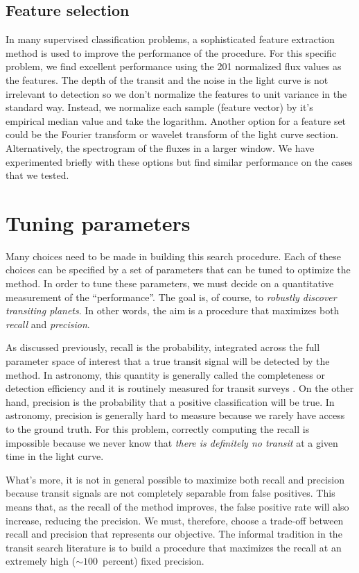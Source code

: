 \documentclass[12pt,preprint]{aastex}
\newcommand{\sectlabel}[1]{\label{sect:#1}}
\begin{document}
\subsection{Feature selection}\sectlabel{features}

In many supervised classification problems, a sophisticated feature
extraction method is used to improve the performance of the procedure.
For this specific problem, we find excellent performance using the 201
normalized flux values as the features.
The depth of the transit and the noise in the light curve is not irrelevant
to detection so we don't normalize the features to unit variance in the
standard way.
Instead, we normalize each sample (feature vector) by it's empirical median
value and take the logarithm.
Another option for a feature set could be the Fourier transform or wavelet
transform of the light curve section.
Alternatively, the spectrogram of the fluxes in a larger window.
We have experimented briefly with these options but find similar performance
on the cases that we tested.


\section{Tuning parameters}\sectlabel{tuning}

Many choices need to be made in building this search procedure.
Each of these choices can be specified by a set of parameters that can be
tuned to optimize the method.
In order to tune these parameters, we must decide on a quantitative
measurement of the ``performance''.
The goal is, of course, to \emph{robustly discover transiting planets}.
In other words, the aim is a procedure that maximizes both \emph{recall} and
\emph{precision}.

As discussed previously, recall is the probability, integrated across the full
parameter space of interest that a true transit signal will be detected by the
method.
In astronomy, this quantity is generally called the completeness or detection
efficiency and it is routinely measured for transit surveys
\citep{Petigura:2013, Dressing:2015, Foreman-Mackey:2015}.
On the other hand, precision is the probability that a positive classification
will be true.
In astronomy, precision is generally hard to measure because we rarely have
access to the ground truth.
For this problem, correctly computing the recall is impossible because we
never know that \emph{there is definitely no transit} at a given time in the
light curve.

What's more, it is not in general possible to maximize both recall and
precision because transit signals are not completely separable from false
positives.
This means that, as the recall of the method improves, the false positive rate
will also increase, reducing the precision.
We must, therefore, choose a trade-off between recall and precision that
represents our objective.
The informal tradition in the transit search literature is to build a
procedure that maximizes the recall at an extremely high ($\sim 100$~percent)
fixed precision.
\end{document}

